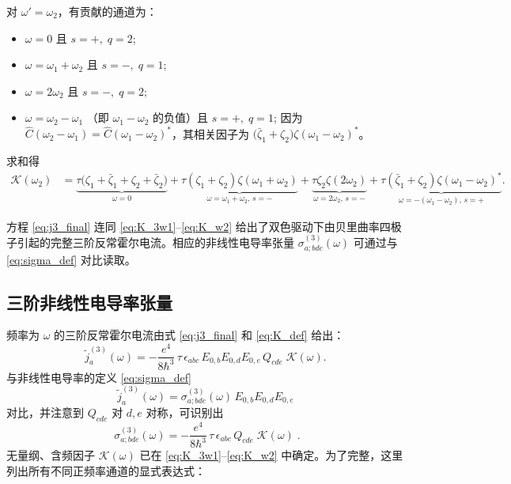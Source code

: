 对 \(\omega'=\omega_2\)，有贡献的通道为：
\begin{itemize}
\item \(\omega=0\) 且 \(s=+,\;q=2\);
\item \(\omega=\omega_1+\omega_2\) 且 \(s=-,\;q=1\);
\item \(\omega=2\omega_2\) 且 \(s=-,\;q=2\);
\item \(\omega=\omega_2-\omega_1\) （即 \(\omega_1-\omega_2\) 的负值）且 \(s=+,\;q=1\);
因为 \(\hat C(\omega_2-\omega_1) = \hat C(\omega_1-\omega_2)^*\)，其相关因子为 \(\big(\bar\zeta_1+\zeta_2\big)\zeta(\omega_1-\omega_2)^*\)。
\end{itemize}
求和得
\begin{align}
\mathcal{K}(\omega_2) &=
\underbrace{\tau\big(\zeta_1+\bar\zeta_1+\zeta_2+\bar\zeta_2\big)}_{\omega=0}
+ \underbrace{\tau(\zeta_1+\zeta_2)\zeta(\omega_1+\omega_2)}_{\omega=\omega_1+\omega_2,\,s=-}
+ \underbrace{\tau\zeta_2\zeta(2\omega_2)}_{\omega=2\omega_2,\,s=-}
+ \underbrace{\tau(\bar\zeta_1+\zeta_2)\zeta(\omega_1-\omega_2)^*}_{\omega=-(\omega_1-\omega_2),\,s=+}.
\label{eq:K_w2}
\end{align}

方程 \eqref{eq:j3_final} 连同 \eqref{eq:K_3w1}--\eqref{eq:K_w2} 给出了双色驱动下由贝里曲率四极子引起的完整三阶反常霍尔电流。相应的非线性电导率张量 \(\sigma^{(3)}_{a;bde}(\omega)\) 可通过与 \eqref{eq:sigma_def} 对比读取。

\subsection{三阶非线性电导率张量}

频率为 \(\omega\) 的三阶反常霍尔电流由式 \eqref{eq:j3_final} 和 \eqref{eq:K_def} 给出：
\begin{equation}
\tilde j^{(3)}_a(\omega) = -\frac{e^4}{8\hbar^3}\,\tau\,
\epsilon_{abc}\,E_{0,b}E_{0,d}E_{0,e}\,Q_{cde}\; \mathcal{K}(\omega).
\label{eq:j3_final_sigma}
\end{equation}
与非线性电导率的定义 \eqref{eq:sigma_def}
\[
\tilde j^{(3)}_a(\omega) = \sigma^{(3)}_{a;bde}(\omega)\,E_{0,b}E_{0,d}E_{0,e}
\]
对比，并注意到 \(Q_{cde}\) 对 \(d,e\) 对称，可识别出
\begin{equation}
{\;
\sigma^{(3)}_{a;bde}(\omega) = -\frac{e^4}{8\hbar^3}\,\tau\,
\epsilon_{abc}\,Q_{cde}\; \mathcal{K}(\omega)\; }.
\label{eq:sigma3_def}
\end{equation}
无量纲、含频因子 \(\mathcal{K}(\omega)\) 已在 \eqref{eq:K_3w1}--\eqref{eq:K_w2} 中确定。为了完整，这里列出所有不同正频率通道的显式表达式：

